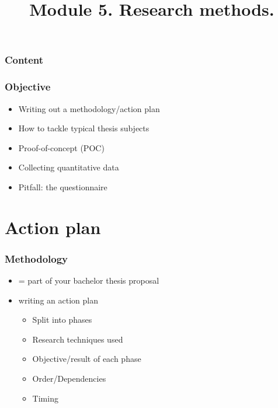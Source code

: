 \documentclass[aspectratio=169]{beamer}
\title{Module 5. Research methods.}
\subtitle{\coursename}
\author{\lecturers}   %
\date{\academicyear}
\begin{document}
\begin{frame}
  \maketitle
\end{frame}

\begin{frame}
  \frametitle{Content}

  \tableofcontents
\end{frame}

\begin{frame}
  \frametitle{Objective}

  \begin{itemize}
    \item Writing out a methodology/action plan
    \item How to tackle typical thesis subjects
    \item Proof-of-concept (POC)
    \item Collecting quantitative data
    \item Pitfall: the questionnaire
  \end{itemize}
\end{frame}

\section{Action plan}

\begin{frame}
  \frametitle{Methodology}

  \begin{itemize}
    \item = part of your bachelor thesis proposal
    \item writing an action plan
          \begin{itemize}
            \item Split into phases
            \item Research techniques used
            \item Objective/result of each phase
            \item Order/Dependencies
            \item Timing
          \end{itemize}
  \end{itemize}
	\bigskip

\end{frame}
\end{document}
